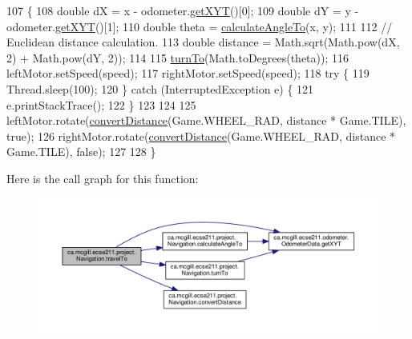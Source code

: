 \begin{DoxyCode}
107                                                       \{
108     \textcolor{keywordtype}{double} dX = x - odometer.\hyperlink{classca_1_1mcgill_1_1ecse211_1_1odometer_1_1_odometer_data_a8f40f0264c68f0cbed4fff1723ae7863}{getXYT}()[0];
109     \textcolor{keywordtype}{double} dY = y - odometer.\hyperlink{classca_1_1mcgill_1_1ecse211_1_1odometer_1_1_odometer_data_a8f40f0264c68f0cbed4fff1723ae7863}{getXYT}()[1];
110     \textcolor{keywordtype}{double} theta = \hyperlink{classca_1_1mcgill_1_1ecse211_1_1project_1_1_navigation_a4376e54162df8f123ca3b52e4fd2f38d}{calculateAngleTo}(x, y);
111 
112     \textcolor{comment}{// Euclidean distance calculation.}
113     \textcolor{keywordtype}{double} distance = Math.sqrt(Math.pow(dX, 2) + Math.pow(dY, 2));
114 
115     \hyperlink{classca_1_1mcgill_1_1ecse211_1_1project_1_1_navigation_a3bbe0645f2b3b3d0986b4a707fb5a00c}{turnTo}(Math.toDegrees(theta));
116     leftMotor.setSpeed(speed);
117     rightMotor.setSpeed(speed);
118     \textcolor{keywordflow}{try} \{
119       Thread.sleep(100);
120     \} \textcolor{keywordflow}{catch} (InterruptedException e) \{
121       e.printStackTrace();
122     \}
123 
124 
125     leftMotor.rotate(\hyperlink{classca_1_1mcgill_1_1ecse211_1_1project_1_1_navigation_ac9e260bcd619ffa4820d7d0de7ea1c12}{convertDistance}(Game.WHEEL\_RAD, distance * Game.TILE), \textcolor{keyword}{true});
126     rightMotor.rotate(\hyperlink{classca_1_1mcgill_1_1ecse211_1_1project_1_1_navigation_ac9e260bcd619ffa4820d7d0de7ea1c12}{convertDistance}(Game.WHEEL\_RAD, distance * Game.TILE), \textcolor{keyword}{false});
127 
128   \}
\end{DoxyCode}
Here is the call graph for this function\+:\nopagebreak
\begin{figure}[H]
\begin{center}
\leavevmode
\includegraphics[width=350pt]{classca_1_1mcgill_1_1ecse211_1_1project_1_1_navigation_a3d8354490a2d8c36090d794c25d33421_cgraph}
\end{center}
\end{figure}

